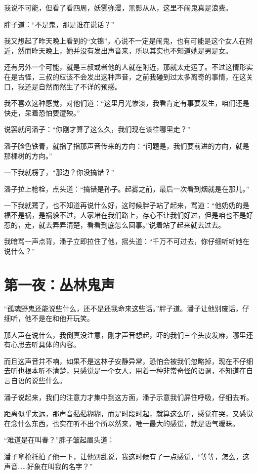 我说不可能，但看了看四周，妖雾弥漫，黑影从从，这里不闹鬼真是浪费。

胖子道：“不是鬼，那是谁在说话？”

我又想起了昨天晚上看到的“文锦”，心说不一定是闹鬼，也有可能是这个女人在附近，然而昨天晚上，她并没有发出声音来，所以其实也不知道她是男是女。

还有另外一个可能，就是三叔或者他的人就在附近，那就太走运了。不过这情形实在是古怪，三叔的应该不会发出这种声音，之前我碰到过太多离奇的事情，在这关口，我还是自然而然生了不详的预感。

我不喜欢这种感觉，对他们道：“这里月光惨淡，我看肯定有事要发生，咱们还是快走，呆着恐怕要遭殃。”

说罢就问潘子：“你刚才算了这么久，我们现在该往哪里走？”

潘子脸色铁青，就指了指那声音传来的方向：“问题是，我们要前进的方向，就是那棵树的方向。”

一下我就楞了，“那边？你没搞错？”

潘子拉上枪栓，点头道：“搞错是孙子。起雾之前，最后一次看到烟就是在那儿。”

一下我就蔫了，也不知道再说什么好，这时候胖子站了起来，骂道：“他奶奶的是福不是祸，是祸躲不过，人家堵在我们路上，存心不让我们好过，但是咱也不是好惹的，走，就去弄弄清楚，看看到底怎么回事。”说着站了起来就去过去。

我暗骂一声点背，潘子立即拉住了他，摇头道：“千万不可过去，你仔细听听她在说什么？”

\chapter{第一夜：丛林鬼声}

“孤魂野鬼还能说些什么，还不是还我命来这些话。”胖子道。潘子让他别废话，仔细听，他不是在和他开玩笑。

那人声在说什么，我倒真没注意，刚才声音想起，吓的我们三个头皮发麻，哪里还有心思去听具体的内容。

而且这声音并不响，如果不是这林子安静异常，恐怕会被我们忽略掉，现在不仔细去听也根本听不清楚，只感觉是一个女人，用着一种非常奇怪的语调，不知道在自言自语的说些什么。

潘子说起来，我们的注意力才集中到这方面，潘子示意我们屏住呼吸，仔细去听。

距离似乎太远，那声音黏黏糊糊，而是时段时起，就算这么听，感觉在哭，又感觉在念什么东西，也实在听不出个所以然来，唯一最大的感觉，就是语气暧昧。

“难道是在叫春？”胖子皱起眉头道：

潘子拿枪托拍了他一下，让他别乱说，我这时候有了一点感觉，“等等，怎么，这声音……好象在叫我的名字？”

